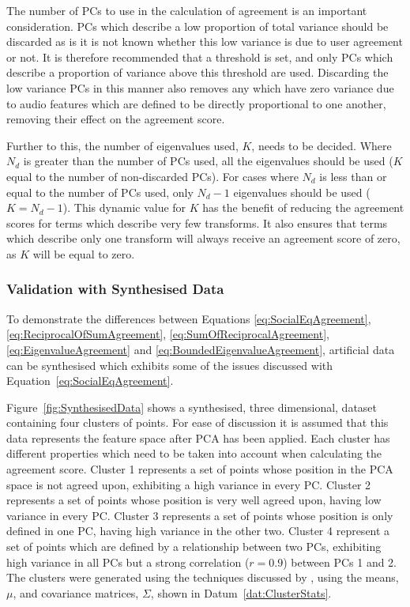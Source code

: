 			The number of PCs to use in the calculation of agreement is an important consideration. PCs which
			describe a low proportion of total variance should be discarded as is it is not known whether this
			low variance is due to user agreement or not. It is therefore recommended that a threshold is set,
			and only PCs which describe a proportion of variance above this threshold are used. Discarding the
			low variance PCs in this manner also removes any which have zero variance due to audio features
			which are defined to be directly proportional to one another, removing their effect on the
			agreement score.

			Further to this, the number of eigenvalues used, $K$, needs to be decided. Where $N_{d}$ is greater
			than the number of PCs used, all the eigenvalues should be used ($K$ equal to the number of
			non-discarded PCs).  For cases where $N_{d}$ is less than or equal to the number of PCs used, only
			$N_{d} - 1$ eigenvalues should be used ($K = N_{d} - 1$). This dynamic value for $K$ has the
			benefit of reducing the agreement scores for terms which describe very few transforms. It also
			ensures that terms which describe only one transform will always receive an agreement score of
			zero, as $K$ will be equal to zero.

		\subsubsection*{Validation with Synthesised Data}
			To demonstrate the differences between Equations \ref{eq:SocialEqAgreement},
			\ref{eq:ReciprocalOfSumAgreement}, \ref{eq:SumOfReciprocalAgreement}, \ref{eq:EigenvalueAgreement}
			and \ref{eq:BoundedEigenvalueAgreement}, artificial data can be synthesised which exhibits some of
			the issues discussed with Equation~\ref{eq:SocialEqAgreement}.
			
			Figure~\ref{fig:SynthesisedData} shows a synthesised, three dimensional, dataset containing four
			clusters of points. For ease of discussion it is assumed that this data represents the feature
			space after PCA has been applied. Each cluster has different properties which need to be taken into
			account when calculating the agreement score. Cluster 1 represents a set of points whose position
			in the PCA space is not agreed upon, exhibiting a high variance in every PC. Cluster 2 represents a
			set of points whose position is very well agreed upon, having low variance in every PC. Cluster 3
			represents a set of points whose position is only defined in one PC, having high variance in the
			other two. Cluster 4 represent a set of points which are defined by a relationship between two PCs,
			exhibiting high variance in all PCs but a strong correlation ($r = 0.9$) between PCs 1 and 2. The
			clusters were generated using the techniques discussed by \citet{ripley1987stochastic}, using the
			means, $\mu$, and covariance matrices, $\Sigma$, shown in Datum~\ref{dat:ClusterStats}.

